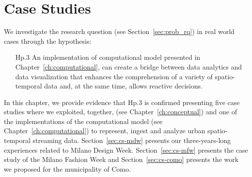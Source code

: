 \chapter{Case Studies}\label{ch:case-studies}

We investigate the research question (see Section~\ref{sec:prob_rq}) in real world cases through the hypothesis:
\begin{itemize}[leftmargin=42pt]
\item[\textsf{Hp.3}] An implementation of \river{} computational model presented in Chapter~\ref{ch:computational}, can create a bridge between data analytics and data visualization that enhances the comprehension of a variety of spatio-temporal data and, at the same time, allows reactive decisions.
\end{itemize}

In this chapter, we provide evidence that \textsf{Hp.3} is confirmed presenting five case studies where we exploited, together, \frappe{} (see Chapter~\ref{ch:conceptual}) and one of the implementations of the \river{} computational model (see Chapter~\ref{ch:computational}) to represent, ingest and analyze urban spatio-temporal streaming data.
Section~\ref{sec:cs-mdw} presents our three-years-long experiences related to Milano Design Week. Section~\ref{sec:cs-mfw} presents the case study of the Milano Fashion Week and Section~\ref{sec:cs-como} presents the work we proposed for the municipality of Como.



